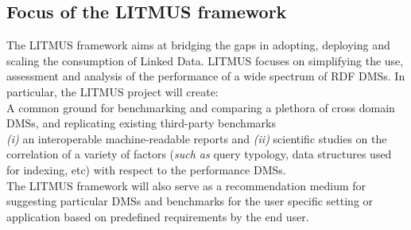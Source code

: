 \documentclass{llncs}
\begin{document}
    \subsection{Focus of the LITMUS framework}
        The LITMUS framework aims at bridging the gaps in adopting, deploying and scaling the consumption of Linked Data. LITMUS focuses on simplifying the use, assessment and analysis of the performance of a wide spectrum of RDF DMSs. In particular, the LITMUS project will create: \\
             A common ground for benchmarking and comparing a plethora of cross domain DMSs, and replicating existing third-party benchmarks \\
             \textit{(i)} an interoperable machine-readable reports and \textit{(ii)} scientific studies on the correlation of a variety of factors (\textit{such as} query typology, data structures used for indexing, etc) with respect to the performance DMSs. \\
             The LITMUS framework will also serve as a recommendation medium for suggesting particular DMSs and benchmarks for the user specific setting or application based on predefined requirements by the end user.  
        
\end{document}
